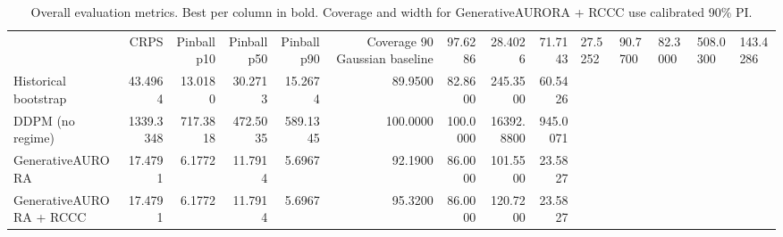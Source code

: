 \begin{table}[ht]
\centering
\caption{Overall evaluation metrics. Best per column in bold. Coverage and width for GenerativeAURORA + RCCC use calibrated 90\% PI.}
\label{tab:overall}
\begin{tabular}{lrrrrrrrr}
\toprule
 & CRPS & Pinball p10 & Pinball p50 & Pinball p90 & Coverage 90%
\midrule
Gaussian baseline & 97.6286 & 28.4026 & 71.7143 & 27.5252 & 90.7700 & 82.3000 & 508.0300 & 143.4286 \\
Historical bootstrap & 43.4964 & 13.0180 & 30.2713 & 15.2674 & 89.9500 & 82.8600 & 245.3500 & 60.5426 \\
DDPM (no regime) & 1339.3348 & 717.3818 & 472.5035 & 589.1345 & 100.0000 & 100.0000 & 16392.8800 & 945.0071 \\
GenerativeAURORA & 17.4791 & 6.1772 & 11.7914 & 5.6967 & 92.1900 & 86.0000 & 101.5500 & 23.5827 \\
GenerativeAURORA + RCCC & 17.4791 & 6.1772 & 11.7914 & 5.6967 & 95.3200 & 86.0000 & 120.7200 & 23.5827 \\
\bottomrule
\end{tabular}
\end{table}